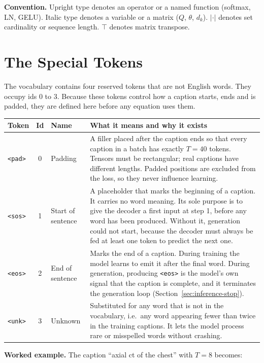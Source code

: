 \documentclass[12pt]{article}
\newcommand{\code}[1]{\texttt{#1}}
\begin{document}
\textbf{Convention.} Upright type denotes an operator or a named function (softmax, LN, GELU). Italic type denotes a variable or a matrix ($Q$, $\theta$, $d_k$). $|\cdot|$ denotes set cardinality or sequence length. $\top$ denotes matrix transpose.

\section{The Special Tokens}

The vocabulary contains four reserved tokens that are not English words. They occupy ids 0 to 3. Because these tokens control how a caption starts, ends and is padded, they are defined here before any equation uses them.

\begin{center}
\begin{tabular}{@{}lcl L{7cm}@{}}
\toprule
Token & Id & Name & What it means and why it exists \\
\midrule
\code{<pad>} & 0 & Padding & A filler placed after the caption ends so that every caption in a batch has exactly $T=40$ tokens. Tensors must be rectangular; real captions have different lengths. Padded positions are excluded from the loss, so they never influence learning. \\[4pt]
\code{<sos>} & 1 & Start of sentence & A placeholder that marks the beginning of a caption. It carries no word meaning. Its sole purpose is to give the decoder a first input at step 1, before any word has been produced. Without it, generation could not start, because the decoder must always be fed at least one token to predict the next one. \\[4pt]
\code{<eos>} & 2 & End of sentence & Marks the end of a caption. During training the model learns to emit it after the final word. During generation, producing \code{<eos>} is the model's own signal that the caption is complete, and it terminates the generation loop (Section~\ref{sec:inference-stop}). \\[4pt]
\code{<unk>} & 3 & Unknown & Substituted for any word that is not in the vocabulary, i.e.\ any word appearing fewer than twice in the training captions. It lets the model process rare or misspelled words without crashing. \\
\bottomrule
\end{tabular}
\end{center}

\textbf{Worked example.} The caption ``axial ct of the chest'' with $T=8$ becomes:
\end{document}
